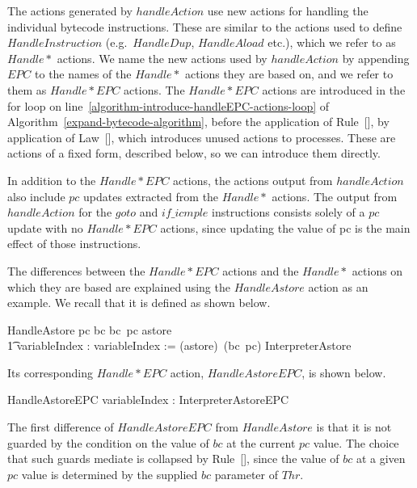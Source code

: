 The actions generated by $handleAction$ use new actions for handling
the individual bytecode instructions.
These are similar to the actions used to define $HandleInstruction$
(e.g.\ $HandleDup$, $HandleAload$ etc.), which we refer to as
$Handle*$ actions.
We name the new actions used by $handleAction$ by appending $EPC$ to
the names of the $Handle*$ actions they are based on, and we refer to
them as $Handle{*}EPC$ actions.
The $Handle{*}EPC$ actions are introduced in the for loop on
line~\ref{algorithm-introduce-handleEPC-actions-loop} of
Algorithm~\ref{expand-bytecode-algorithm}, before the application of
Rule~[], by application of
Law~[], which introduces unused actions to
processes.
These are actions of a fixed form, described below, so we can
introduce them directly.

In addition to the $Handle{*}EPC$ actions, the actions output from
$handleAction$ also include $pc$ updates extracted from the $Handle*$
actions.
The output from $handleAction$ for the $goto$ and $if\_icmple$
instructions consists solely of a $pc$ update with no $Handle{*}EPC$
actions, since updating the value of pc is the main effect of those
instructions.

The differences between the $Handle{*}EPC$ actions and the $Handle*$
actions on which they are based are explained using the $HandleAstore$
action as an example.
We recall that it is defined as shown below.
\begin{circusaction}
  HandleAstore \circdef \lcircguard pc \in \dom bc \land bc~pc \in \ran astore \rcircguard \circguard \\
  \t1 \circvar variableIndex : \nat \circspot variableIndex := (astore\inv)~(bc~pc) \circseq \lschexpract InterpreterAstore \rschexpract
\end{circusaction}
Its corresponding $Handle{*}EPC$ action, $HandleAstoreEPC$, is shown
below.
\begin{circusaction}
  HandleAstoreEPC \circdef \circval variableIndex : \nat \circspot \lschexpract InterpreterAstoreEPC \rschexpract
\end{circusaction}
The first difference of $HandleAstoreEPC$ from $HandleAstore$ is that
it is not guarded by the condition on the value of $bc$ at the current
$pc$ value.
The choice that such guards mediate is collapsed by
Rule~[], since the value of
$bc$ at a given $pc$ value is determined by the supplied $bc$
parameter of $Thr$.

